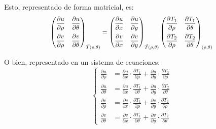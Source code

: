 \documentclass[a5paper,12pt,twoside]{book}
\begin{document}
Esto, representado de forma matricial, es:
\begin{equation*}
    \scale{0.9}{
    \begin{pmatrix}
        \dfrac{\partial u}{\partial \rho} & \dfrac{\partial u}{\partial \theta}
        \\[1em]
        \dfrac{\partial v}{\partial \rho} & \dfrac{\partial v}{\partial \theta}
    \end{pmatrix}_{\Vec{T}(\rho,\theta)}
    =
    \begin{pmatrix}
        \dfrac{\partial u}{\partial x} & \dfrac{\partial u}{\partial y}
        \\[1em]
        \dfrac{\partial v}{\partial x} & \dfrac{\partial v}{\partial y}
    \end{pmatrix}_{\Vec{T}(\rho,\theta)}
    \begin{pmatrix}
        \dfrac{\partial T_1}{\partial \rho} & \dfrac{\partial T_1}{\partial \theta}
        \\[1em]
        \dfrac{\partial T_2}{\partial \rho} & \dfrac{\partial T_2}{\partial \theta}
    \end{pmatrix}_{(\rho,\theta)}
    }
\end{equation*}

O bien, representado en un sistema de ecuaciones:
\begin{equation*}
    \left\{
    \begin{aligned}
        \frac{\partial u}{\partial \rho} &=
        \frac{\partial u}{\partial x} \cdot \frac{\partial T_1}{\partial \rho} + \frac{\partial u}{\partial y} \cdot \frac{\partial T_2}{\partial \rho}
        \\[1ex]
        \frac{\partial u}{\partial \theta} &=
        \frac{\partial u}{\partial x} \cdot \frac{\partial T_1}{\partial \theta} + \frac{\partial u}{\partial y} \cdot \frac{\partial T_2}{\partial \theta}
        \\[1ex]
        \frac{\partial v}{\partial \rho} &=
        \frac{\partial v}{\partial x} \cdot \frac{\partial T_1}{\partial \rho} + \frac{\partial v}{\partial y} \cdot \frac{\partial T_2}{\partial \rho}
        \\[1ex]
        \frac{\partial v}{\partial \theta} &=
        \frac{\partial v}{\partial x} \cdot \frac{\partial T_1}{\partial \theta} + \frac{\partial v}{\partial y} \cdot \frac{\partial T_2}{\partial \theta}
    \end{aligned}
    \right.
\end{equation*}
\end{document}
